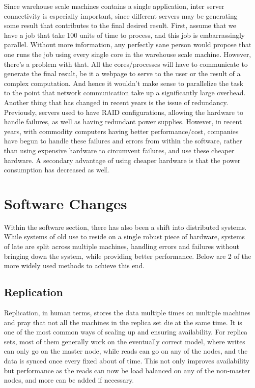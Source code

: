 \documentclass[]{article}
\begin{document}
Since warehouse scale machines contains a single application, inter server connectivity is especially important, since different servers may be generating some result that contributes to the final desired result. First, assume that we have a job that take 100 units of time to process, and this job is embarrassingly parallel. Without more information, any perfectly sane person would propose that one runs the job using every single core in the warehouse scale machine. However, there's a problem with that. All the cores/processes will have to communicate to generate the final result, be it a webpage to serve to the user or the result of a complex computation. And hence it wouldn't make sense to parallelize the task to the point that network communication take up a significantly large overhead. \\

Another thing that has changed in recent years is the issue of redundancy. Previously, servers used to have RAID configurations, allowing the hardware to handle failures, as well as having redundant power supplies. However, in recent years, with commodity computers having better performance/cost, companies have begun to handle these failures and errors from within the software, rather than using expensive hardware to circumvent failures, and use these cheaper hardware.  A secondary advantage of using cheaper hardware is that the power consumption has decreased as well. \\

\section{Software Changes}

Within the software section, there has also been a shift into distributed systems. While systems of old use to reside on a single robust piece of hardware, systems of late are split across multiple machines, handling errors and failures without bringing down the system, while providing better performance. Below are 2 of the more widely used methods to achieve this end.  \\

\subsection{Replication}

Replication, in human terms, stores the data multiple times on multiple machines and pray that not all the machines in the replica set die at the same time. It is one of the most common ways of scaling up and ensuring availability. For replica sets, most of them generally work on the eventually correct model, where writes can only go on the master node, while reads can go on any of the nodes, and the data is synced once every fixed about of time. This not only improves availability but performance as the reads can now be load balanced on any of the non-master nodes, and more can be added if necessary. \\
\end{document}
